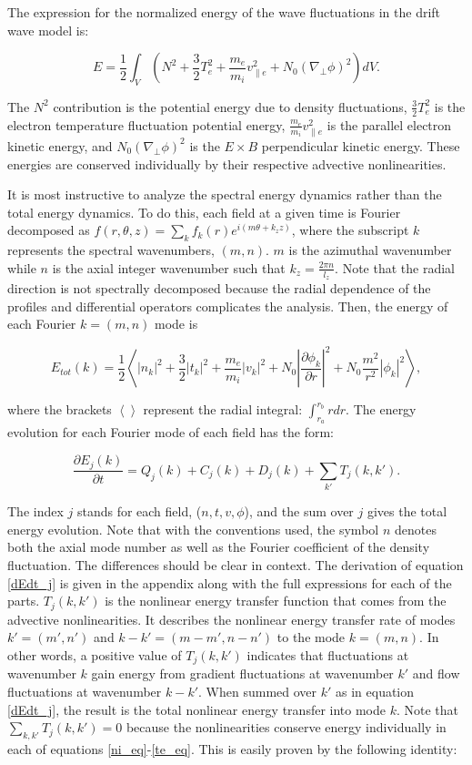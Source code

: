 \documentclass[twocolumn,showpacs,preprintnumbers,amsmath,amssymb]{revtex4}
\def\beq{\begin{equation}}
\def\eeq{\end{equation}}
\newcommand{\pdiff}[2]{\frac{\partial#1}{\partial#2}}
\def\grad{\nabla}
\newcommand{\gradperp}{\grad_\perp}
\newcommand{\vpe}{v_{\parallel e}}
\begin{document}
The expression for the normalized energy of the wave fluctuations in the drift wave model is:

\beq
\label{energy_eq}
E = \frac{1}{2} \int_V  (N^2 + \frac{3}{2} T_e^2 + \frac{m_e}{m_i} \vpe^2 + N_0 (\gradperp \phi)^2 ) dV.
\eeq

The $N^2$ contribution is the potential energy due to density fluctuations, $\frac{3}{2} T_e^2$ is the electron temperature fluctuation potential energy,
$\frac{m_e}{m_i} \vpe^2$ is the parallel electron kinetic energy, and $N_0 (\gradperp \phi)^2$ is the $E \times B$ perpendicular kinetic energy.
These energies are conserved individually by their respective advective nonlinearities.

It is most instructive to analyze the spectral energy dynamics rather than the total energy dynamics. To do this, each field at a given time is Fourier decomposed as 
$f(r,\theta,z) = \sum_k f_k(r) e^{i (m \theta + k_z z )}$,
where the subscript $k$ represents the spectral wavenumbers, $(m,n)$. $m$ is the azimuthal wavenumber while $n$ is the axial integer wavenumber such that $k_z = \frac{2 \pi n}{l_z}$. Note that
the radial direction is not spectrally decomposed because the radial dependence of the profiles and differential operators complicates the analysis.
Then, the energy of each Fourier $k = (m,n)$ mode is

\beq
\label{E_k}
E_{tot}(k) = \frac{1}{2} \left< |n_k|^2 + \frac{3}{2} |t_k|^2 + \frac{m_e}{m_i} |v_k|^2 + N_0 \left| \pdiff{\phi_k}{r} \right|^2 + N_0 \frac{m^2}{r^2} |\phi_k|^2 \right>,
\eeq

where the brackets $\left< \right>$ represent the radial integral: $\int_{r_a}^{r_b} r dr$. 
The energy evolution for each Fourier mode of each field has the form:

\beq
\label{dEdt_j}
\pdiff{E_{j}(k)}{t} = Q_{j}(k) + C_{j}(k) + D_j(k) + \sum_{k'} T_{j}(k,k').
\eeq

The index $j$ stands for each field, ($n,t,v,\phi$), and the sum over $j$ gives the total energy evolution. Note that with the conventions used, the symbol $n$ denotes both the axial mode number as
well as the Fourier coefficient of the density fluctuation. The differences should be clear in context. The derivation of equation \ref{dEdt_j} 
is given in the appendix along with the full expressions for each of the parts. $T_{j}(k,k')$ is the nonlinear energy transfer function that comes from the advective
nonlinearities.  It describes the nonlinear energy transfer rate of modes $k'=(m',n')$ and $k-k'=(m-m',n-n')$ to the mode $k=(m,n)$. 
In other words, a positive value of $T_{j}(k,k')$ indicates that fluctuations
at wavenumber $k$ gain energy from gradient fluctuations at wavenumber $k'$ and flow fluctuations at wavenumber $k-k'$.
When summed over $k'$ as in equation \ref{dEdt_j}, the result is the total
nonlinear energy transfer into mode $k$. Note that $\sum_{k,k'} T_{j}(k,k') = 0$ because the nonlinearities conserve energy individually in each of equations \ref{ni_eq}-\ref{te_eq}.
This is easily proven by the following identity:
\end{document}
